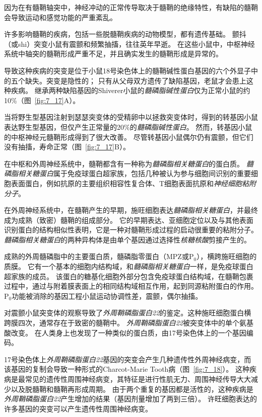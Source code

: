 \begin{proposition}[髓鞘蛋白缺陷破坏神经信号传导] \label{box:7_3}
	
	\quad \quad 因为在有髓鞘轴突中，神经冲动的正常传导取决于髓鞘的绝缘特性，有缺陷的髓鞘会导致运动和感觉功能的严重紊乱。
	
	\quad \quad 许多影响髓鞘的疾病，包括一些脱髓鞘疾病的动物模型，都有遗传基础。
	颤抖（或shi）突变小鼠有震颤和频繁抽搐，往往英年早逝。
	在这些小鼠中，中枢神经系统中轴突的髓鞘形成严重不足，并且确实发生的髓鞘形成是异常的。
	
	\quad \quad 导致这种疾病的突变是位于小鼠18号染色体上的髓鞘碱性蛋白基因的六个外显子中的五个缺失。突变是隐性的；
	只有从父母双方遗传了缺陷基因，老鼠才会患上这种疾病。
	继承两种缺陷基因的Shiverer小鼠的\textit{髓磷脂碱性蛋白}仅为正常小鼠的约10\%（图~\ref{fig:7_17}A）。
	
	\quad \quad 当将野生型基因注射到瑟瑟突变体的受精卵中以拯救突变体时，得到的转基因小鼠表达野生型基因，但仅产生正常量的20\%的\textit{髓磷脂碱性蛋白}。
	然而，转基因小鼠的中枢神经元髓鞘形成得到了很大改善。
	尽管转基因小鼠偶尔仍有震颤，但它们没有抽搐，寿命正常（图~\ref{fig:7_17}B）。
	
	\quad \quad 在中枢和外周神经系统中，髓鞘都含有一种称为\textit{髓磷脂相关糖蛋白}的蛋白质。
	\textit{髓磷脂相关糖蛋白}属于免疫球蛋白超家族，包括几种被认为参与细胞间识别的重要细胞表面蛋白，例如抗原的主要组织相容性复合体、T细胞表面抗原和\textit{神经细胞粘附分子}。
	
	\quad \quad 在外周神经系统中，在髓鞘产生的早期，施旺细胞表达\textit{髓磷脂相关糖蛋白}，并最终成为成熟（致密）髓鞘的组成部分。
	它的早期表达、亚细胞定位以及与其他表面识别蛋白的结构相似性表明，它是一种对髓鞘形成过程的启动很重要的粘附分子。
	\textit{髓磷脂相关糖蛋白}的两种异构体是由单个基因通过选择性\textit{核糖核酸}剪接产生的。
	
	\quad 成熟的外周髓磷脂中的主要蛋白质，髓磷脂零蛋白（MPZ或P$_0$），横跨施旺细胞的质膜。
	它有一个基本的细胞内结构域，和\textit{髓磷脂相关糖蛋白}一样，是免疫球蛋白超家族的成员。
	该蛋白的糖基化细胞外部分包含免疫球蛋白结构域，在髓鞘包裹过程中，通过与附着膜表面上的相同结构域相互作用，起到同源粘附蛋白的作用。
	P$_0$功能被消除的基因工程小鼠运动协调性差，震颤，偶尔抽搐。
	
	\quad 对震颤小鼠突变体的观察导致了\textit{外周鞘磷脂蛋白22}的鉴定。这种施旺细胞蛋白横跨膜四次，通常存在于致密的髓鞘中。
	\textit{外周鞘磷脂蛋白22}被突变体中的单个氨基酸改变。
	在人类身上也发现了一种类似的蛋白质，由17号染色体上的一个基因编码。
	
	\quad \quad 17号染色体上\textit{外周鞘磷脂蛋白22}基因的突变会产生几种遗传性外周神经病变，而该基因的复制会导致一种形式的Charcot-Marie Tooth病（图~\ref{fig:7_18}）。
	这种疾病是最常见的遗传性周围神经病变，其特征是进行性肌无力、周围神经传导大大减少以及脱髓鞘和髓鞘再形成周期。
	由于两个重复的基因都是活性的，这种疾病是\textit{外周鞘磷脂蛋白22}产生增加的结果（基因剂量增加了两到三倍）。
	许旺细胞表达的许多基因的突变可以产生遗传性周围神经病变。
	

\end{proposition}
